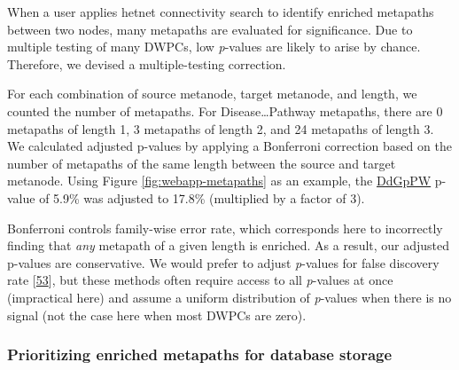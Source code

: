 When a user applies hetnet connectivity search to identify enriched metapaths between two nodes,
many metapaths are evaluated for significance.
Due to multiple testing of many DWPCs, low \emph{p}-values are likely to arise by chance.
Therefore, we devised a multiple-testing correction.

For each combination of source metanode, target metanode, and length, we counted the number of metapaths.
For Disease\ldots Pathway metapaths, there are 0 metapaths of length 1, 3 metapaths of length 2, and 24 metapaths of length 3.
We calculated adjusted p-values by applying a Bonferroni correction based on the number of metapaths of the same length between the source and target metanode.
Using Figure \ref{fig:webapp-metapaths} as an example, the \href{https://het.io/search/?source=17287\&target=7607\&metapaths=DdGpPW\&complete=}{DdGpPW} p-value of 5.9\% was adjusted to 17.8\% (multiplied by a factor of 3).

Bonferroni controls family-wise error rate,
which corresponds here to incorrectly finding that \emph{any} metapath of a given length is enriched.
As a result, our adjusted p-values are conservative.
We would prefer to adjust \emph{p}-values for false discovery rate {[}\protect\hyperlink{ref-q6QyrHEZ}{53}{]},
but these methods often require access to all \emph{p}-values at once (impractical here) and assume a uniform distribution of \emph{p}-values when there is no signal (not the case here when most DWPCs are zero).

\hypertarget{prioritizing-enriched-metapaths-for-database-storage}{%
\subsubsection{Prioritizing enriched metapaths for database storage}\label{prioritizing-enriched-metapaths-for-database-storage}}

